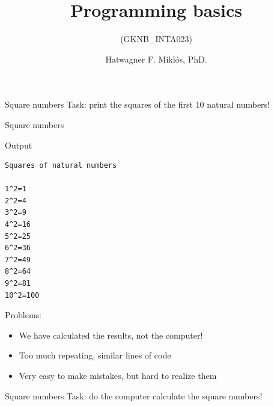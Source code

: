 \documentclass[usenames,dvipsnames,aspectratio=169]{beamer}
\title[Lecture 2.]{Programming basics}
\subtitle{(GKNB\_INTA023)}
\author{Hatwagner F. Miklós, PhD.}
\institute{Széchenyi István University, Győr, Hungary}
\newcommand{\kiemel}[1]{{\color{kiemelesszin}#1}}
\begin{document}
\begin{frame}[plain]
  \titlepage
\end{frame}

\begin{frame}{Square numbers}
  Task: print the squares of the first 10 natural numbers!
  \footnotesize
  \begin{exampleblock}{}
      \vspace{-0.3cm}
          
      \vspace{-0.3cm}
  \end{exampleblock}
\end{frame}

\begin{frame}[fragile]{Square numbers}
  \footnotesize
  \begin{block}{Output}
    \begin{verbatim}
Squares of natural numbers

1^2=1
2^2=4
3^2=9
4^2=16
5^2=25
6^2=36
7^2=49
8^2=64
9^2=81
10^2=100
\end{verbatim}
  \end{block}
  Problems:
  \begin{itemize}
    \item \kiemel{We have calculated the results, not the computer!}
    \item Too much repeating, similar lines of code
    \item Very easy to make mistakes, but hard to realize them
  \end{itemize}
\end{frame}

\begin{frame}{Square numbers}
  Task: do the computer calculate the square numbers!
  \footnotesize
  \begin{exampleblock}{}
      
      
  \end{exampleblock}
\end{frame}
\end{document}
